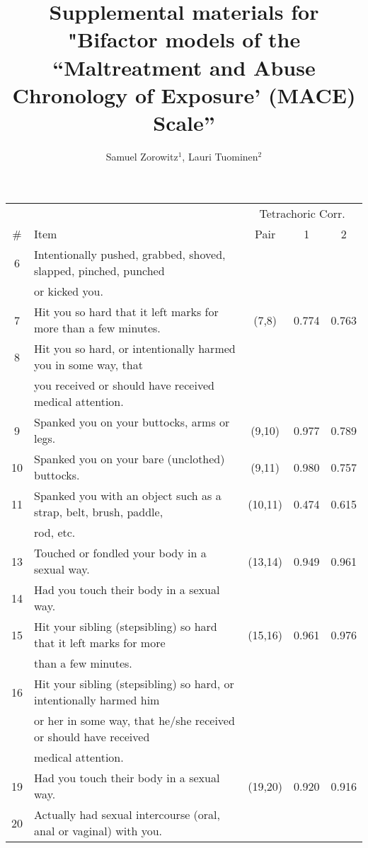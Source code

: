 \documentclass[letterpaper,man,natbib]{apa6}  %
\title{Supplemental materials for "Bifactor models of the ``Maltreatment and Abuse Chronology of Exposure' (MACE) Scale''}
\author{Samuel Zorowitz$^1$, Lauri Tuominen$^{2}$}
\affiliation{$^1$Princeton Neuroscience Institute, Princeton University, USA\\$^2$The Royal’s Institute of Mental Health Research, University of Ottawa, Canada}
\begin{document}
\maketitle

\begin{table}
\begin{tabular*}{\textwidth}{clccc}
\centering
& & \multicolumn{3}{c}{Tetrachoric Corr.} \\
\cmidrule(lr){3-5}
\# & Item & Pair & 1 & 2 \\
\toprule
6 & {\small Intentionally pushed, grabbed, shoved, slapped, pinched, punched} & \\
  & {\small or kicked you.} & \\
7 & {\small Hit you so hard that it left marks for more than a few minutes.} & (7,8) & 0.774 & 0.763 \\
8 & {\small Hit you so hard, or intentionally harmed you in some way, that} & \\
& {\small you received or should have received medical attention.} & \\
\midrule
9	& {\small Spanked you on your buttocks, arms or legs.} & (9,10) & 0.977 & 0.789 \\
10	& {\small Spanked you on your bare (unclothed) buttocks.} & (9,11) & 0.980 & 0.757 \\
11 & {\small Spanked you with an object such as a strap, belt, brush, paddle,} & (10,11) & 0.474 & 0.615 \\
 & {\small rod, etc.} & \\
\midrule
13 & {\small Touched or fondled your body in a sexual way.} & (13,14) & 0.949 & 0.961 \\
14 & {\small Had you touch their body in a sexual way.} & \\
\midrule
15 & {\small Hit your sibling (stepsibling) so hard that it left marks for more} & (15,16) & 0.961 & 0.976 \\
& {\small than a few minutes.} & \\
16 & {\small Hit your sibling (stepsibling) so hard, or intentionally harmed him} & \\
& {\small or her in some way, that he/she received or should have received} & \\
& {\small medical attention.} & \\
\midrule
19 & {\small Had you touch their body in a sexual way.} & (19,20) & 0.920 & 0.916 \\
20 & {\small Actually had sexual intercourse (oral, anal or vaginal) with you.} & \\

\end{tabular*}
\end{table}
\end{document}

